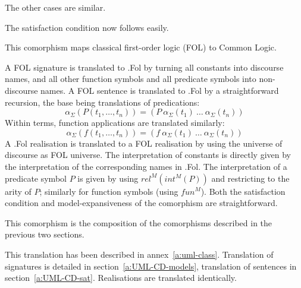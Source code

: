 \documentclass[10pt, a4paper]{isov2}
\newcommand*{\CL}{\ensuremath{\mathsf{CL}}\xspace}
\begin{document}
        The other cases are similar.

	 The satisfaction condition now follows easily.


\ssclause{$FOL \rightarrow \CL$}

This comorphism  maps classical first-order logic (FOL) to Common Logic.


A FOL signature is translated to \Clogic.Fol by turning all constants
into discourse names, and all other function symbols and all predicate
symbols into non-discourse names. A FOL sentence is translated
to \Clogic.Fol by a straightforward recursion, the base being translations
of predications:
$$\alpha_\Sigma(P(t_1,\ldots,t_n)) = (P\ \alpha_\Sigma(t_1)\ \ldots\ \alpha_\Sigma(t_n))$$
Within terms, function applications are translated similarly:
$$\alpha_\Sigma(f(t_1,\ldots,t_n)) = (f\ \alpha_\Sigma(t_1)\ \ldots\ \alpha_\Sigma(t_n))$$
A \Clogic.Fol realisation is translated to a FOL realisation 
by using the universe of
discourse as FOL universe. The interpretation of constants is
directly given by the interpretation of the corresponding names
in \Clogic.Fol. The interpretation of a predicate symbol $P$ is given
by using $rel^M(int^M(P))$ and restricting to the arity of $P$;
similarly for function symbols (using $fun^M$). Both the satisfaction condition
and model-expansiveness of the comorphism are straightforward.


\ssclause{$\OWL \rightarrow \CL$}

This comorphism is the composition of the comorphisms described in the previous
two sections.

\ssclause{UML class models $\to \CL$}


This translation has been described in annex~\ref{a:uml-class}. 
Translation of signatures is detailed in section~\ref{a:UML-CD-models},
translation of sentences in section~\ref{a:UML-CD-sat}.
Realisations are translated identically.
\end{document}
